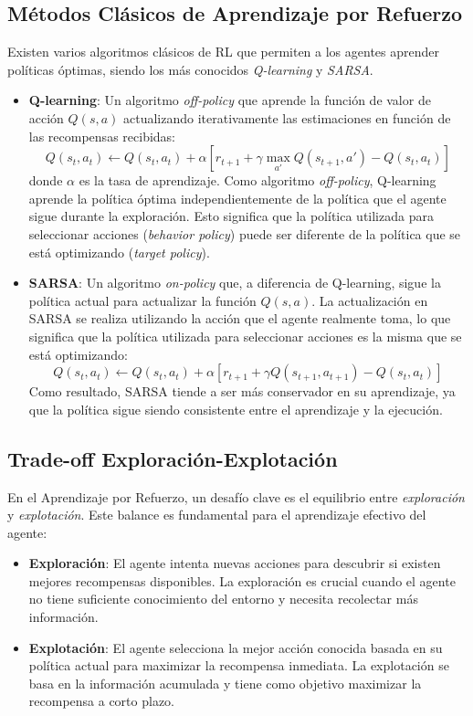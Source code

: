\documentclass[a4paper,12pt]{report}
\begin{document}
\subsection{Métodos Clásicos de Aprendizaje por Refuerzo}

Existen varios algoritmos clásicos de RL que permiten a los agentes aprender políticas óptimas, siendo los más conocidos \textit{Q-learning} y \textit{SARSA}.

\begin{itemize}
    \item \textbf{Q-learning}: Un algoritmo \textit{off-policy} que aprende la función de valor de acción \(Q(s, a)\) actualizando iterativamente las estimaciones en función de las recompensas recibidas:
    \[
    Q(s_t, a_t) \leftarrow Q(s_t, a_t) + \alpha \left[r_{t+1} + \gamma \max_{a'} Q(s_{t+1}, a') - Q(s_t, a_t)\right]
    \]
    donde \(\alpha\) es la tasa de aprendizaje. Como algoritmo \textit{off-policy}, Q-learning aprende la política óptima independientemente de la política que el agente sigue durante la exploración. Esto significa que la política utilizada para seleccionar acciones (\textit{behavior policy}) puede ser diferente de la política que se está optimizando (\textit{target policy}).

    \item \textbf{SARSA}: Un algoritmo \textit{on-policy} que, a diferencia de Q-learning, sigue la política actual para actualizar la función \(Q(s, a)\). La actualización en SARSA se realiza utilizando la acción que el agente realmente toma, lo que significa que la política utilizada para seleccionar acciones es la misma que se está optimizando:
    \[
    Q(s_t, a_t) \leftarrow Q(s_t, a_t) + \alpha \left[r_{t+1} + \gamma Q(s_{t+1}, a_{t+1}) - Q(s_t, a_t)\right]
    \]
    Como resultado, SARSA tiende a ser más conservador en su aprendizaje, ya que la política sigue siendo consistente entre el aprendizaje y la ejecución.
\end{itemize}

\subsection{Trade-off Exploración-Explotación}

En el Aprendizaje por Refuerzo, un desafío clave es el equilibrio entre \textit{exploración} y \textit{explotación}. Este balance es fundamental para el aprendizaje efectivo del agente:

\begin{itemize}
    \item \textbf{Exploración}: El agente intenta nuevas acciones para descubrir si existen mejores recompensas disponibles. La exploración es crucial cuando el agente no tiene suficiente conocimiento del entorno y necesita recolectar más información.
    \item \textbf{Explotación}: El agente selecciona la mejor acción conocida basada en su política actual para maximizar la recompensa inmediata. La explotación se basa en la información acumulada y tiene como objetivo maximizar la recompensa a corto plazo.
\end{itemize}
\end{document}
